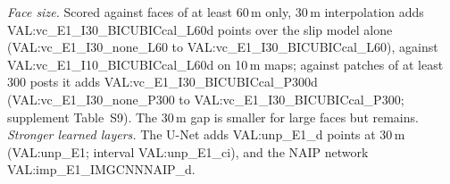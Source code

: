 \textit{Face size.} Scored against faces of at least 60\,m only, 30\,m interpolation adds {{VAL:vc_E1_I30_BICUBICcal_L60d}} points over the slip model alone ({{VAL:vc_E1_I30_none_L60}} to {{VAL:vc_E1_I30_BICUBICcal_L60}}), against {{VAL:vc_E1_I10_BICUBICcal_L60d}} on 10\,m maps; against patches of at least 300 posts it adds {{VAL:vc_E1_I30_BICUBICcal_P300d}} ({{VAL:vc_E1_I30_none_P300}} to {{VAL:vc_E1_I30_BICUBICcal_P300}}; supplement Table~S9). The 30\,m gap is smaller for large faces but remains. \textit{Stronger learned layers.} The U-Net adds {{VAL:unp_E1_d}} points at 30\,m ({{VAL:unp_E1}}; interval {{VAL:unp_E1_ci}}), and the NAIP network {{VAL:imp_E1_IMGCNNNAIP_d}}.
